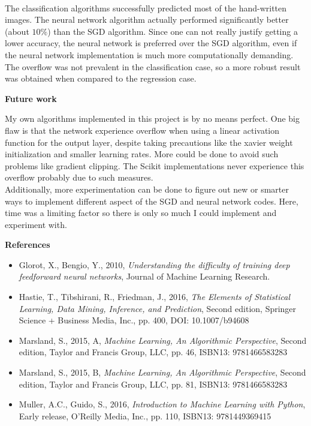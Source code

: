 \documentclass[12pt,a4paper]{article}
\begin{document}
\\
The classification algorithms successfully predicted most of the hand-written images. The neural network algorithm actually performed significantly better (about $10\%$) than the SGD algorithm. Since one can not really justify getting a lower accuracy, the neural network is preferred over the SGD algorithm, even if the neural network implementation is much more computationally demanding. The overflow was not prevalent in the classification case, so a more robust result was obtained when compared to the regression case. 

\newpage

\begin{center}
\Large{\textbf{Future work}}
\end{center}

\noindent My own algorithms implemented in this project is by no means perfect. One big flaw is that the network experience overflow when using a linear activation function for the output layer, despite taking precautions like the xavier weight initialization and smaller learning rates. More could be done to avoid such problems like gradient clipping. The Scikit implementations never experience this overflow probably due to such measures. 
\\
Additionally, more experimentation can be done to figure out new or smarter ways to implement different aspect of the SGD and neural network codes. Here, time was a limiting factor so there is only so much I could implement and experiment with.

\newpage

\begin{center}
\Large{\textbf{References}}
\end{center}

\begin{itemize}
  \item Glorot, X., Bengio, Y., 2010, \emph{Understanding the difficulty of training deep feedforward neural networks}, Journal of Machine Learning Research.
  \item Hastie, T., Tibshirani, R., Friedman, J., 2016, \emph{The Elements of Statistical Learning, Data Mining, Inference, and Prediction}, Second edition, Springer Science + Business Media, Inc., pp. 400, DOI: 10.1007/b94608
  \item Marsland, S., 2015, A, \emph{Machine Learning, An Algorithmic Perspective}, Second edition, Taylor and Francis Group, LLC, pp. 46, ISBN13: 9781466583283
  \item Marsland, S., 2015, B, \emph{Machine Learning, An Algorithmic Perspective}, Second edition, Taylor and Francis Group, LLC, pp. 81, ISBN13: 9781466583283
  \item Muller, A.C., Guido, S., 2016, \emph{Introduction to Machine Learning with Python}, Early release, O'Reilly Media, Inc., pp. 110, ISBN13: 9781449369415
\end{itemize}
\end{document}
